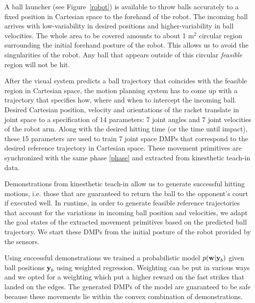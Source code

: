 A ball launcher (see Figure~\ref{robot}) is available to throw balls accurately to a fixed position in Cartesian space to the forehand of the robot. The incoming ball arrives with low-variability in desired positions and higher-variability in ball velocities. The whole area to be covered amounts to about 1 m$^2$ circular region surrounding the initial forehand posture of the robot. This allows us to avoid the singularities of the robot. Any ball that appears outside of this circular \emph{feasible} region will not be hit.

After the visual system predicts a ball trajectory that coincides with the feasible region in Cartesian space, the motion planning system has to come up with a trajectory that specifies how, where and when to intercept the incoming ball. Desired Cartesian position, velocity and orientations of the racket translate in joint space to a specification of 14 parameters: 7 joint angles and 7 joint velocities of the robot arm. Along with the desired hitting time (or the time until impact), these 15 parameters are used to train 7 joint space DMPs that correspond to the desired reference trajectory in Cartesian space. These movement primitives are synchronized with the same phase \eqref{phase} and extracted from kinesthetic teach-in data.

Demonstrations from kinesthetic teach-in allow us to generate successful hitting motions, i.e. those that are guaranteed to return the ball to the opponent's court if executed well. In runtime, in order to generate feasible reference trajectories that account for the variations in incoming ball position and velocities, we adapt the goal states of the extracted movement primitives based on the predicted ball trajectory. We start these DMPs from the initial posture of the robot provided by the sensors.

Using successful demonstrations we trained a probabilistic model $p(\boldsymbol{\mathrm{w}}|\boldsymbol{\mathrm{y}}_b)$ given ball positions $\boldsymbol{\mathrm{y}}_b$ using weighted regression. Weighting can be put in various ways and we opted for a weighting which put a higher reward on the fast strikes that landed on the edges. The generated DMPs of the model are guaranteed to be safe because these movements lie within the convex combination of demonstrations. 


